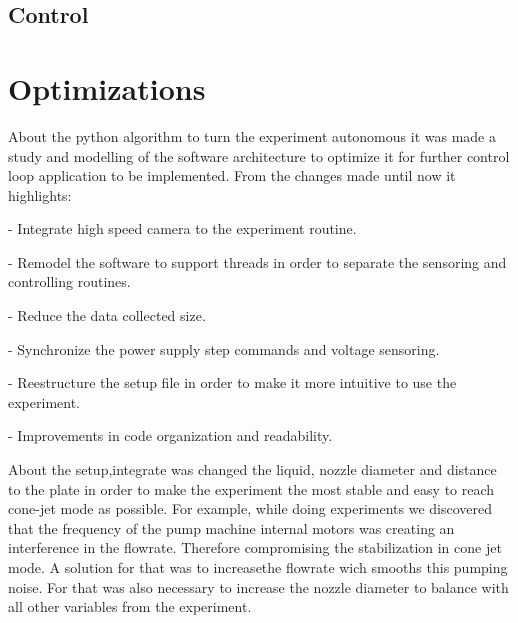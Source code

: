 \subsection{Control}

\section{Optimizations}
\label{sec:routine_optimization}

About the python algorithm to turn the experiment autonomous it was made a study and modelling of the software architecture to optimize it for further control loop application to be implemented. From the changes made until now it highlights:

- Integrate high speed camera to the experiment routine.

- Remodel the software to support threads in order to separate the sensoring and controlling routines.

- Reduce the data collected size.

- Synchronize the power supply step commands and voltage sensoring.

- Reestructure the setup file in order to make it more intuitive to use the experiment.

- Improvements in code organization and readability.

About the setup,integrate was changed the liquid, nozzle diameter and distance to the plate in order to
make the experiment the most stable and easy to reach cone-jet mode as possible. For example, while doing experiments we discovered that the frequency of the pump machine internal motors was creating an interference in the flowrate. Therefore compromising the stabilization in cone jet mode. A solution for that was to increasethe flowrate wich smooths this pumping noise. For that was also necessary to increase the nozzle diameter to balance with all other variables from the experiment.

\clearpage
